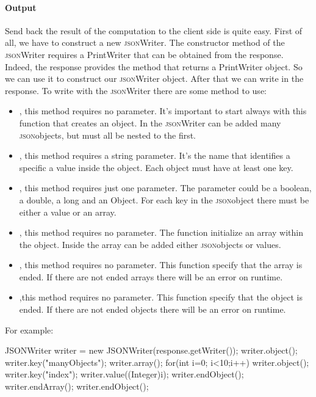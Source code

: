 \paragraph{Output} Send back the result of the computation to the client side is quite easy. First of all, we have to construct a new \textsc{json}Writer. The constructor method of the \textsc{json}Writer requires a PrintWriter that can be obtained from the response. Indeed, the response provides the  method that returns a PrintWriter object. So we can use it to construct our \textsc{json}Writer object. After that we can write in the response.
To write with the \textsc{json}Writer there are some method to use:
\begin{itemize}
	\item {}, this method requires no parameter. It's important to start always with this function that creates an object. In the \textsc{json}Writer can be added many \textsc{json}objects, but must all be nested to the first.
	\item {}, this method requires a string parameter. It's the name that identifies a specific a value inside the object. Each object must have at least one key.
	\item {}, this method requires just one parameter. The parameter could be a boolean, a double, a long and an Object. For each key in the \textsc{json}object there must be either a value or an array.
	\item {}, this method requires no parameter. The  function initialize an array within the object. Inside the array can be added either \textsc{json}objects or values.
	\item {}, this method requires no parameter. This function specify that the array is ended. If there are not ended arrays there will be an error on runtime.
	\item {},this method requires no parameter. This function specify that the object is ended. If there are not ended objects there will be an error on runtime.
\end{itemize}
For example:
\begin{code}
JSONWriter writer = 
          new JSONWriter(response.getWriter());
writer.object();
writer.key("manyObjects");
writer.array();
   for(int i=0; i<10;i++) {
      writer.object();
      writer.key("index");
      writer.value((Integer)i);
      writer.endObject();
   }
writer.endArray();
writer.endObject();
\end{code}

